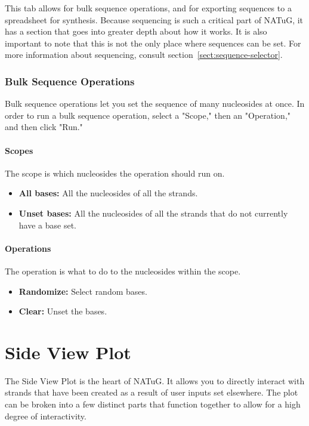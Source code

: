 \documentclass[titlepage]{article}
\begin{document}
	This tab allows for bulk sequence operations, and for exporting sequences to a spreadsheet for synthesis. Because sequencing is such a critical part of NATuG, it has a section that goes into greater depth about how it works. It is also important to note that this is not the only place where sequences can be set. For more information about sequencing, consult section~\ref{sect:sequence-selector}.
	
	\subsubsection{Bulk Sequence Operations}
	Bulk sequence operations let you set the sequence of many nucleosides at once. In order to run a bulk sequence operation, select a "Scope," then an "Operation," and then click "Run."
	
	\paragraph{Scopes}
	The scope is which nucleosides the operation should run on.
	
	\begin{itemize}
		\item \textbf{All bases:} All the nucleosides of all the strands.
		\item \textbf{Unset bases:} All the nucleosides of all the strands that do not currently have a base set.
	\end{itemize}

	\paragraph{Operations}
	The operation is what to do to the nucleosides within the scope.
	
	\begin{itemize}
		\item \textbf{Randomize:} Select random bases.
		\item \textbf{Clear:} Unset the bases.
	\end{itemize}
	
	\section{Side View Plot}
	The Side View Plot is the heart of NATuG. It allows you to directly interact with strands that have been created as a result of user inputs set elsewhere. The plot can be broken into a few distinct parts that function together to allow for a high degree of interactivity. 
	
\end{document}

